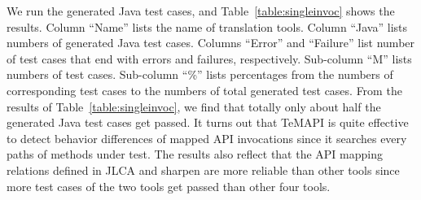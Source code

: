 We run the generated Java test cases, and Table~\ref{table:singleinvoc} shows the results. Column ``Name'' lists the name of translation tools. Column ``Java'' lists numbers of generated Java test cases. Columns ``Error'' and ``Failure'' list number of test cases that end with errors and failures, respectively. Sub-column ``M'' lists numbers of test cases. Sub-column ``\%'' lists percentages from the numbers of corresponding test cases to the numbers of total generated test cases. From the results of Table~\ref{table:singleinvoc}, we find that totally only about half the generated Java test cases get passed. It turns out that TeMAPI is quite effective to detect behavior differences of mapped API invocations since it searches every paths of methods under test. The results also reflect that the API mapping relations defined in JLCA and sharpen are more reliable than other tools since more test cases of the two tools get passed than other four tools.
